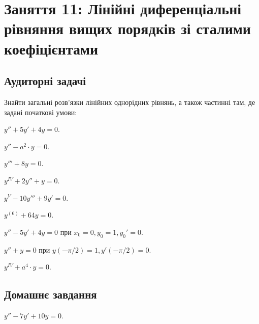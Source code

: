 \section*{Заняття 11: Лінійні диференціальні рівняння вищих порядків зі сталими коефіцієнтами}

\subsection*{Аудиторні задачі}

Знайти загальні розв'язки лінійних однорідних рівнянь, а також частинні там, де задані початкові умови:

\begin{problem}
	$y'' + 5 y' + 4 y = 0$.
\end{problem}

\begin{problem}
	$y'' - a^2 \cdot y = 0$.
\end{problem}

\begin{problem}
	$y''' + 8 y = 0$.
\end{problem}

\begin{problem}
	$y^{IV} + 2 y'' + y = 0$.
\end{problem}

\begin{problem}
	$y^V - 10 y''' + 9 y' = 0$.
\end{problem}

\begin{problem}
	$y^{(6)} + 64 y = 0$.
\end{problem}

\begin{problem}
	$y'' - 5 y' + 4 y = 0$ при $x_0 = 0, y_0 = 1, y_0' = 0$.
\end{problem}

\begin{problem}
	$y'' + y = 0$ при $y(-\pi / 2) = 1, y'(-\pi / 2) = 0$.
\end{problem}

\begin{problem}
	$y^{IV} + a^4 \cdot y = 0$.
\end{problem}

\subsection*{Домашнє завдання}

\begin{problem}
	$y'' - 7 y' + 10 y = 0$.
\end{problem}

